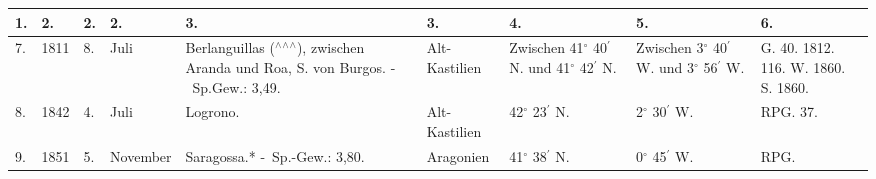 \documentclass[a4paper, 8pt, oneside, polutonikogreek, german]{article}
\begin{document}
\begin{landscape}
\begin{table}[!ht]
    \centering
    \footnotesize
    \begin{tabular}{|l|l|l|l|p{40mm}|l|p{14mm}|p{14mm}|p{14mm}|}
    \hline
        1. & 2. & 2. & 2. & 3. & 3. & 4. & 5. & 6. \\ \hline
        7. & 1811 & 8. & Juli & Berlanguillas ($^\wedge$$^\wedge$$^\wedge$), zwischen Aranda und Roa, S. von Burgos. - Sp.Gew.: 3,49. & Alt-Kastilien & Zwischen 41$^\circ$ 40$^\prime$ N. und 41$^\circ$ 42$^\prime$ N. & Zwischen 3$^\circ$ 40$^\prime$ W. und 3$^\circ$ 56$^\prime$ W. & G. 40. 1812. 116. W. 1860. S. 1860. \\ \hline
        8. & 1842 & 4. & Juli & Logrono. & Alt-Kastilien & 42$^\circ$ 23$^\prime$ N. & 2$^\circ$ 30$^\prime$ W. & RPG. 37. \\ \hline
        9. & 1851 & 5. & November & Saragossa.* - Sp.-Gew.: 3,80. & Aragonien & 41$^\circ$ 38$^\prime$ N. & 0$^\circ$ 45$^\prime$ W. & RPG. \\ \hline
    \end{tabular}
\end{table}
\end{landscape}
\clearpage
\end{document}
